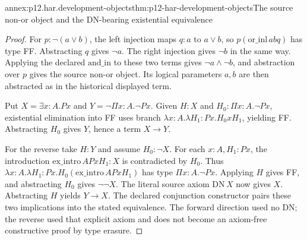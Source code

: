 \begin{annexitem}{annex:p12.har.development-objects}{thm:p12-har-development-objects}{The source non-or object and the DN-bearing existential equivalence}
\begin{proof}
For \(p:\neg(a\lor b)\), the left injection maps
\(q:a\) to \(a\lor b\), so \(p(\mathrm{or\_inl}\,a b q)\)
has type FF. Abstracting \(q\) gives \(\neg a\).
The right injection gives \(\neg b\) in the same way.
Applying the declared \(\mathrm{and\_in}\) to these two terms
gives \(\neg a\land\neg b\), and abstraction over \(p\)
gives the source non-or object. Its logical parameters \(a,b\)
are then abstracted as in the historical displayed term.

Put \(X=\exists x:A.Px\) and
\(Y=\neg\Pi x:A.\neg Px\). Given \(H:X\) and
\(H_0:\Pi x:A.\neg Px\), existential elimination into FF uses
branch \(\lambda x:A.\lambda H_1:Px.H_0xH_1\), yielding FF.
Abstracting \(H_0\) gives \(Y\), hence a term \(X\to Y\).

For the reverse take \(H:Y\) and assume \(H_0:\neg X\).
For each \(x:A,H_1:Px\), the introduction
\(\mathrm{ex\_intro}\,A P xH_1:X\) is contradicted by \(H_0\).
Thus \(\lambda x:A.\lambda H_1:Px.
H_0(\mathrm{ex\_intro}\,A P xH_1)\) has type
\(\Pi x:A.\neg Px\). Applying \(H\) gives FF, and
abstracting \(H_0\) gives \(\neg\neg X\).
The literal source axiom \(\mathrm{DN}\,X\) now gives \(X\).
Abstracting \(H\) yields \(Y\to X\). The declared conjunction
constructor pairs these two implications into the stated equivalence.
The forward direction used no DN; the reverse used that explicit axiom
and does not become an axiom-free constructive proof by type erasure.
\end{proof}
\end{annexitem}

